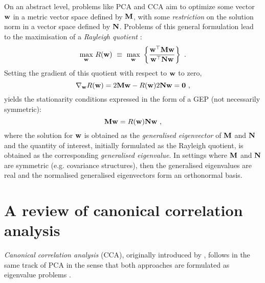     On an abstract level, problems like PCA and CCA aim to optimize some vector $\mathbf{w}$ in a metric vector space defined by $\mathbf{M}$, with some \emph{restriction} on the solution norm in a vector space defined by $\mathbf{N}$. Problems of this general formulation lead to the maximisation of a \textit{Rayleigh quotient} \citep{Parlett:symmetric80, Horn:matrix90}:
    \begin{equation} \label{equ:chap4_rayleigh}
      \underset{ \mathbf{w} }{ \textrm{max} } ~ R(\mathbf{w}) ~\equiv~
      \underset{ \mathbf{w} }{ \textrm{max} } ~ \left\{ \frac{ \mathbf{w}^\top \mathbf{M}\mathbf{w} }{ \mathbf{w}^\top \mathbf{N}\mathbf{w} } \right\} ~.
    \end{equation}
    Setting the gradient of this quotient with respect to $\mathbf{w}$ to zero,
    \begin{equation*}
      \nabla_{\mathbf{w}} R(\mathbf{w}) = 2 \mathbf{M} \mathbf{w} - R(\mathbf{w}) 2 \mathbf{N} \mathbf{w} = \mathbf{0} ~,
    \end{equation*}
    yields the stationarity conditions expressed in the form of a GEP (not necessarily symmetric):
    \[
      \mathbf{M} \mathbf{w} = R(\mathbf{w}) \mathbf{N} \mathbf{w} ~,
    \]
    where the solution for $\mathbf{w}$ is obtained as the \emph{generalised eigenvector} of $\mathbf{M}$ and $\mathbf{N}$ and the quantity of interest, initially formulated as the Rayleigh quotient, is obtained as the corresponding \emph{generalised eigenvalue}.
    In settings where $\mathbf{M}$ and $\mathbf{N}$ are symmetric (e.g. covariance structures), then the generalised eigenvalues are real and the normalised generalised eigenvectors form an orthonormal basis.

    
  \section{A review of canonical correlation analysis} \label{sec:chap4_reviewCCA}
    
    \textit{Canonical correlation analysis} (CCA), originally introduced by \citet{Hotelling:relations36}, follows in the same track of PCA \citep{Hotelling:analysis33} in the sense that both approaches are formulated as eigenvalue problems \citep{DeBie:eigenproblems05}.

